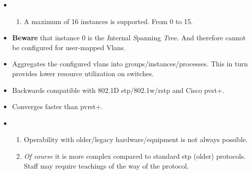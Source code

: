\begin{itemize}
    \item {}
    \begin{enumerate}
        \item A maximum of 16 instances is supported. {\footnotesize From 0 to 15.}
    \end{enumerate}
    \item \textbf{Beware} that instance 0 is the \textit{I}nternal \textit{S}panning \textit{T}ree. And therefore cannot be configured for user-mapped Vlans.
    \item Aggregates the configured vlans into groups/instances/processes. This in turn provides lower resource utilization on switches. \dWinkey
    \item Backwards compatible with 802.1D \gls{stp}/802.1w/\gls{rstp} and Cisco \gls{pvst+}.
    \item Converges faster than \gls{pvrst+}.
    \item {}
    \begin{enumerate}
        \item Operability with older/legacy hardware/equipment is not always possible.
        \item \textit{Of course} it is more complex compared to standard \gls{stp} (older) protocols. {\footnotesize Staff may require teachings of the way of the protocol.}
    \end{enumerate}
\end{itemize}

\begin{table}[h]
    \centering
    \caption{MST Attributes}
    \label{mstattr}
\end{table}

